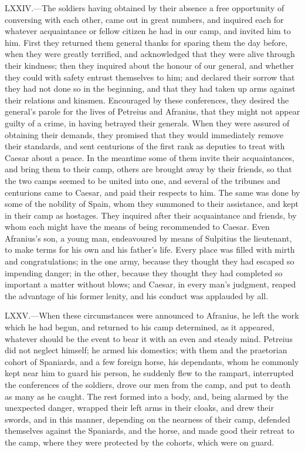 LXXIV.—The soldiers having obtained by their absence a free opportunity
of conversing with each other, came out in great numbers, and inquired
each for whatever acquaintance or fellow citizen he had in our camp, and
invited him to him. First they returned them general thanks for sparing
them the day before, when they were greatly terrified, and acknowledged
that they were alive through their kindness; then they inquired about
the honour of our general, and whether they could with safety entrust
themselves to him; and declared their sorrow that they had not done so
in the beginning, and that they had taken up arms against their
relations and kinsmen. Encouraged by these conferences, they desired the
general's parole for the lives of Petreius and Afranius, that they might
not appear guilty of a crime, in having betrayed their generals. When
they were assured of obtaining their demands, they promised that they
would immediately remove their standards, and sent centurions of the
first rank as deputies to treat with Caesar about a peace. In the
meantime some of them invite their acquaintances, and bring them to
their camp, others are brought away by their friends, so that the two
camps seemed to be united into one, and several of the tribunes and
centurions came to Caesar, and paid their respects to him. The same was
done by some of the nobility of Spain, whom they summoned to their
assistance, and kept in their camp as hostages. They inquired after
their acquaintance and friends, by whom each might have the means of
being recommended to Caesar. Even Afranius's son, a young man,
endeavoured by means of Sulpitius the lieutenant, to make terms for his
own and his father's life. Every place was filled with mirth and
congratulations; in the one army, because they thought they had escaped
so impending danger; in the other, because they thought they had
completed so important a matter without blows; and Caesar, in every
man's judgment, reaped the advantage of his former lenity, and his
conduct was applauded by all.

LXXV.—When these circumstances were announced to Afranius, he left the
work which he had begun, and returned to his camp determined, as it
appeared, whatever should be the event to bear it with an even and
steady mind. Petreius did not neglect himself; he armed his domestics;
with them and the praetorian cohort of Spaniards, and a few foreign
horse, his dependants, whom he commonly kept near him to guard his
person, he suddenly flew to the rampart, interrupted the conferences of
the soldiers, drove our men from the camp, and put to death as many as
he caught. The rest formed into a body, and, being alarmed by the
unexpected danger, wrapped their left arms in their cloaks, and drew
their swords, and in this manner, depending on the nearness of their
camp, defended themselves against the Spaniards, and the horse, and made
good their retreat to the camp, where they were protected by the
cohorts, which were on guard.

